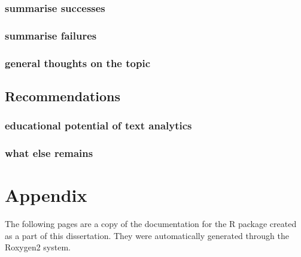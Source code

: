 \documentclass[11pt, a4paper, oneside]{report}
\begin{document}
\subsection{summarise successes}
\subsection{summarise failures}
\subsection{general thoughts on the topic}

\section{Recommendations}\label{sec:recommendations}

\subsection{educational potential of text analytics}
\subsection{what else remains}

\chapter{Appendix}\label{cha:appendix}

The following pages are a copy of the documentation for the R package
created as a part of this dissertation. They were automatically
generated through the Roxygen2 system.

% 

{}
\printglossaries
{}
\printindex
{}
\printbibliography
\end{document}

